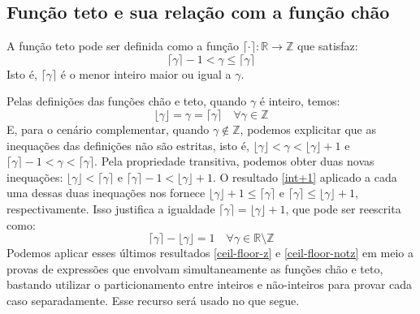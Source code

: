 \subsection*{Função teto e sua relação com a função chão}

A função teto pode ser definida
como a função $\lceil \cdot \rceil : \mathds{R} \to \mathds{Z}$
que satisfaz:
\begin{equation}\tag{Teto}
  \lceil \gamma \rceil - 1 < \gamma \le \lceil \gamma \rceil
\end{equation}
Isto é,
$\lceil \gamma \rceil$ é o menor inteiro maior ou igual a $\gamma$.

Pelas definições das funções chão e teto,
quando $\gamma$ é inteiro, temos:
\begin{equation}\label{ceil-floor-z}
  \lfloor \gamma \rfloor = \gamma = \lceil \gamma \rceil
  \quad \forall \gamma \in \mathds{Z}
\end{equation}
E, para o cenário complementar, quando $\gamma \notin \mathds{Z}$,
podemos explicitar que as inequações das definições não são estritas,
isto é, $\lfloor \gamma \rfloor < \gamma < \lfloor \gamma \rfloor + 1$
e $\lceil \gamma \rceil - 1 < \gamma < \lceil \gamma \rceil$.
Pela propriedade transitiva, podemos obter duas novas inequações:
$\lfloor \gamma \rfloor < \lceil \gamma \rceil$
e $\lceil \gamma \rceil - 1 < \lfloor \gamma \rfloor + 1$.
O resultado \eqref{int+1}
aplicado a cada uma dessas duas inequações nos fornece
$\lfloor \gamma \rfloor + 1 \le \lceil \gamma \rceil$ e
$\lceil \gamma \rceil \le \lfloor \gamma \rfloor + 1$, respectivamente.
Isso justifica a igualdade
$\lceil \gamma \rceil = \lfloor \gamma \rfloor + 1$,
que pode ser reescrita como:
\begin{equation}\label{ceil-floor-notz}
  \lceil \gamma \rceil - \lfloor \gamma \rfloor = 1
  \quad \forall \gamma \in \mathds{R} \setminus \mathds{Z}
\end{equation}
Podemos aplicar esses últimos resultados
\eqref{ceil-floor-z} e \eqref{ceil-floor-notz}
em meio a provas de expressões
que envolvam simultaneamente as funções chão e teto,
bastando utilizar o particionamento entre inteiros e não-inteiros
para provar cada caso separadamente.
Esse recurso será usado no que segue.

